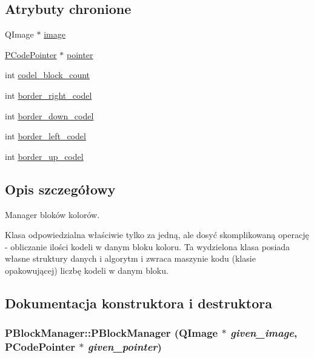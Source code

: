 \subsection*{Atrybuty chronione}
\begin{CompactItemize}
\item 
QImage $\ast$ \hyperlink{classPBlockManager_429ddf44eba8dc97ccd38d67d4b8172f}{image}
\item 
\hyperlink{classPCodePointer}{PCodePointer} $\ast$ \hyperlink{classPBlockManager_835bfe00bdbea928d1b4ad6212cf733c}{pointer}
\item 
int \hyperlink{classPBlockManager_679ed25c188f4a6d2fd20a167a4bb4eb}{codel\_\-block\_\-count}
\item 
int \hyperlink{classPBlockManager_8d73c339ef6be4cd3a960b96b0c4f1fe}{border\_\-right\_\-codel}
\item 
int \hyperlink{classPBlockManager_9a2e17b1fa59c0b083e760a385b3565f}{border\_\-down\_\-codel}
\item 
int \hyperlink{classPBlockManager_2bb1887ef5658a211da5edbc3a248058}{border\_\-left\_\-codel}
\item 
int \hyperlink{classPBlockManager_80de22998ec78cc92162eadd6036506f}{border\_\-up\_\-codel}
\end{CompactItemize}


\subsection{Opis szczegółowy}
Manager bloków kolorów. 

Klasa odpowiedzialna właściwie tylko za jedną, ale dosyć skomplikowaną operację - obliczanie ilości kodeli w danym bloku koloru. Ta wydzielona klasa posiada własne struktury danych i algorytm i zwraca maszynie kodu (klasie opakowującej) liczbę kodeli w danym bloku. 

\subsection{Dokumentacja konstruktora i destruktora}
\hypertarget{classPBlockManager_f5a95fca85a31c0257b38b57cbb3378a}{
\subsubsection[{PBlockManager}]{\setlength{\rightskip}{0pt plus 5cm}PBlockManager::PBlockManager (QImage $\ast$ {\em given\_\-image}, \/  {\bf PCodePointer} $\ast$ {\em given\_\-pointer})}}
\label{classPBlockManager_f5a95fca85a31c0257b38b57cbb3378a}


